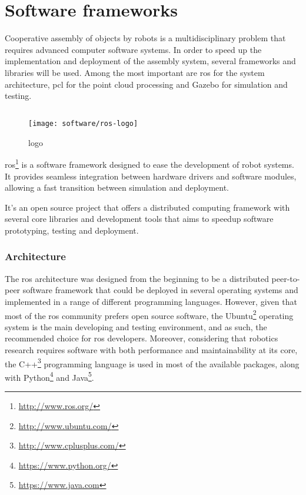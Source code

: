 \section{Software frameworks}

Cooperative assembly of objects by robots is a multidisciplinary problem that requires advanced computer software systems. In order to speed up the implementation and deployment of the assembly system, several frameworks and libraries will be used. Among the most important are \gls{ros} for the system architecture, \gls{pcl} for the point cloud processing and Gazebo for simulation and testing.

\subsection{}

\begin{wrapfigure}{r}{0.25\textwidth}
	\centering
	\texttt{[image: software/ros-logo]}
	\caption{ logo}
	\label{fig:ros-logo}
\end{wrapfigure}

\gls{ros}\footnote{\url{http://www.ros.org/}} \cite{Quigley2009} is a software framework designed to ease the development of robot systems. It provides seamless integration between hardware drivers and software modules, allowing a fast transition between simulation and deployment.

It's an open source project that offers a distributed computing framework with several core libraries and development tools that aims to speedup software prototyping, testing and deployment.


\subsubsection{Architecture}

The \gls{ros} architecture was designed from the beginning to be a distributed peer-to-peer software framework that could be deployed in several operating systems and implemented in a range of different programming languages. However, given that most of the \gls{ros} community prefers open source software, the Ubuntu\footnote{\url{http://www.ubuntu.com/}} operating system is the main developing and testing environment, and as such, the recommended choice for \gls{ros} developers. Moreover, considering that robotics research requires software with both performance and maintainability at its core, the C++\footnote{\url{http://www.cplusplus.com/}} programming language is used in most of the available packages, along with Python\footnote{\url{https://www.python.org/}} and Java\footnote{\url{https://www.java.com}}.

